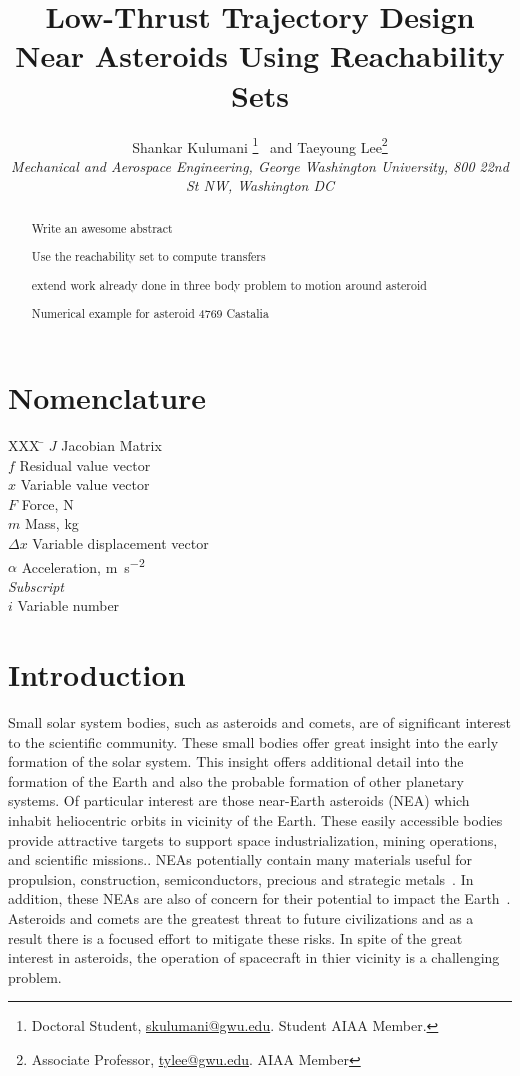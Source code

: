 \documentclass[]{aiaa-tc}%
\title{Low-Thrust Trajectory Design Near Asteroids Using Reachability Sets}
\author{
  Shankar Kulumani\thanksibid{1}%
    \thanks{Doctoral Student, \href{mailto:skulumani@gwu.edu}{skulumani@gwu.edu}. Student AIAA Member.}
  \ and Taeyoung Lee\thanksibid{2}\thanks{Associate Professor, \href{mailto:tylee@gwu.edu}{tylee@gwu.edu}. AIAA Member}\\
  {\normalsize\itshape
   Mechanical and Aerospace Engineering, George Washington University, 800 22nd St NW, Washington DC }\\
   }
\begin{document}
\maketitle

\begin{abstract}
Write an awesome abstract

Use the reachability set to compute transfers

extend work already done in three body problem to motion around asteroid

Numerical example for asteroid 4769 Castalia
\end{abstract}

\section*{Nomenclature}

\begin{tabbing}
  XXX \= \kill%
  $J$ \> Jacobian Matrix \\
  $f$ \> Residual value vector \\
  $x$ \> Variable value vector \\
  $F$ \> Force, \si{\newton} \\
  $m$ \> Mass, \si{\kilo\gram} \\
  $\Delta x$ \> Variable displacement vector \\
  $\alpha$ \> Acceleration, \si{\meter\per\second\squared} \\[5pt]
  \textit{Subscript}\\
  $i$ \> Variable number \\
\end{tabbing}

\section{Introduction}

Small solar system bodies, such as asteroids and comets, are of significant interest to the scientific community.
These small bodies offer great insight into the early formation of the solar system.
This insight offers additional detail into the formation of the Earth and also the probable formation of other planetary systems.
Of particular interest are those near-Earth asteroids (NEA) which inhabit heliocentric orbits in vicinity of the Earth.
These easily accessible bodies provide attractive targets to support space industrialization, mining operations, and scientific missions..
NEAs potentially contain many materials useful for propulsion, construction, semiconductors, precious and strategic metals~\cite{ross2001}.
In addition, these NEAs are also of concern for their potential to impact the Earth~\cite{wie2008}.
Asteroids and comets are the greatest threat to future civilizations and as a result there is a focused effort to mitigate these risks.
In spite of the great interest in asteroids, the operation of spacecraft in thier vicinity is a challenging problem.
\end{document}

